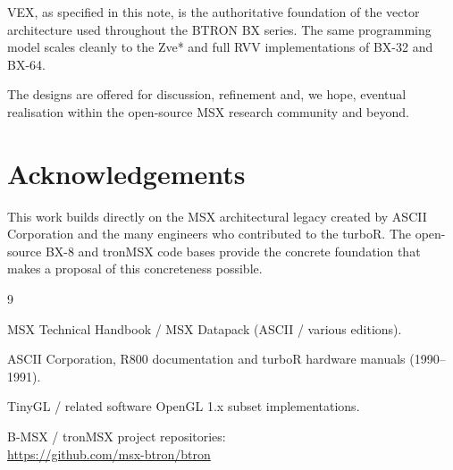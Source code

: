 \documentclass[11pt,a4paper]{article}
\begin{document}
VEX, as specified in this note, is the authoritative foundation of the vector architecture used throughout the BTRON BX series. The same programming model scales cleanly to the Zve* and full RVV implementations of BX-32 and BX-64.

The designs are offered for discussion, refinement and, we hope, eventual realisation within the open-source MSX research community and beyond.

\section*{Acknowledgements}

This work builds directly on the MSX architectural legacy created by ASCII Corporation and the many engineers who contributed to the turboR. The open-source BX-8 and tronMSX code bases provide the concrete foundation that makes a proposal of this concreteness possible.

\begin{thebibliography}{9}

MSX Technical Handbook / MSX Datapack (ASCII / various editions).

ASCII Corporation, R800 documentation and turboR hardware manuals (1990--1991).

TinyGL / related software OpenGL 1.x subset implementations.

B-MSX / tronMSX project repositories:\\
\url{https://github.com/msx-btron/btron}

\end{thebibliography}
\end{document}
